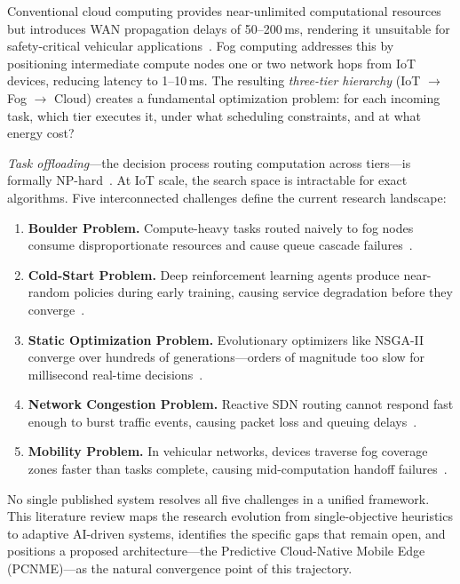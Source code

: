 \documentclass[12pt,a4paper]{article}
\begin{document}
Conventional cloud computing provides near-unlimited computational resources but
introduces WAN propagation delays of 50--200\,ms, rendering it unsuitable for
safety-critical vehicular applications~\cite{jafari2021}. Fog computing addresses
this by positioning intermediate compute nodes one or two network hops from IoT
devices, reducing latency to 1--10\,ms. The resulting \emph{three-tier hierarchy}
(IoT $\rightarrow$ Fog $\rightarrow$ Cloud) creates a fundamental optimization
problem: for each incoming task, which tier executes it, under what scheduling
constraints, and at what energy cost?

\emph{Task offloading}---the decision process routing computation across tiers---is
formally NP-hard~\cite{mashal2024drl}. At IoT scale, the search space is
intractable for exact algorithms. Five interconnected challenges define the current
research landscape:

\begin{enumerate}[leftmargin=*, label=\textbf{C\arabic*.}]
  \item \textbf{Boulder Problem.} Compute-heavy tasks routed naively to fog nodes
    consume disproportionate resources and cause queue cascade failures~\cite{nouri2024tof}.
  \item \textbf{Cold-Start Problem.} Deep reinforcement learning agents produce
    near-random policies during early training, causing service degradation before
    they converge~\cite{vfc_drl2024}.
  \item \textbf{Static Optimization Problem.} Evolutionary optimizers like NSGA-II
    converge over hundreds of generations---orders of magnitude too slow for
    millisecond real-time decisions~\cite{zhu2025dag}.
  \item \textbf{Network Congestion Problem.} Reactive SDN routing cannot respond
    fast enough to burst traffic events, causing packet loss and queuing
    delays~\cite{csfd2025,gasmi2024sdn}.
  \item \textbf{Mobility Problem.} In vehicular networks, devices traverse fog
    coverage zones faster than tasks complete, causing mid-computation handoff
    failures~\cite{mavto2024,paper5_mobility}.
\end{enumerate}

No single published system resolves all five challenges in a unified framework.
This literature review maps the research evolution from single-objective heuristics
to adaptive AI-driven systems, identifies the specific gaps that remain open,
and positions a proposed architecture---the Predictive Cloud-Native Mobile Edge
(PCNME)---as the natural convergence point of this trajectory.
\end{document}
